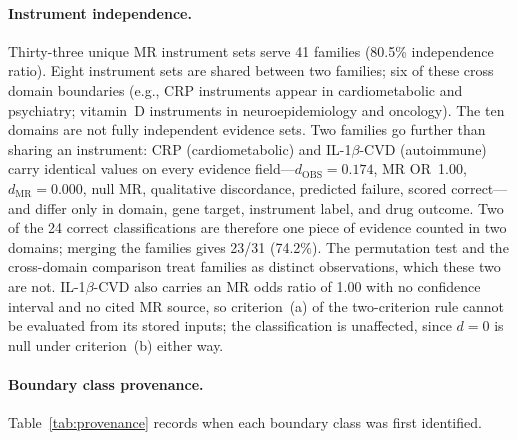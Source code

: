 \documentclass[11pt]{article}
\begin{document}
\paragraph{Instrument independence.} Thirty-three unique MR instrument sets serve 41 families (80.5\% independence ratio). Eight instrument sets are shared between two families; six of these cross domain boundaries (e.g., CRP instruments appear in cardiometabolic and psychiatry; vitamin~D instruments in neuroepidemiology and oncology). The ten domains are not fully independent evidence sets. Two families go further than sharing an instrument: CRP (cardiometabolic) and IL-1$\beta$-CVD (autoimmune) carry identical values on every evidence field---$d_{\text{OBS}} = 0.174$, MR OR~1.00, $d_{\text{MR}} = 0.000$, null MR, qualitative discordance, predicted failure, scored correct---and differ only in domain, gene target, instrument label, and drug outcome. Two of the 24 correct classifications are therefore one piece of evidence counted in two domains; merging the families gives 23/31 (74.2\%). The permutation test and the cross-domain comparison treat families as distinct observations, which these two are not. IL-1$\beta$-CVD also carries an MR odds ratio of 1.00 with no confidence interval and no cited MR source, so criterion~(a) of the two-criterion rule cannot be evaluated from its stored inputs; the classification is unaffected, since $d = 0$ is null under criterion~(b) either way.

\paragraph{Boundary class provenance.}
Table~\ref{tab:provenance} records when each boundary class was first identified.
\end{document}
